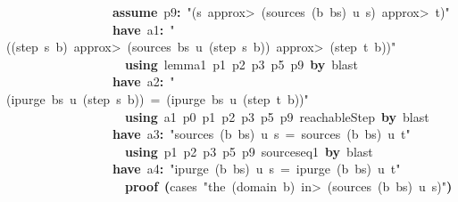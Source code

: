 \documentclass{article}
\newcommand{\syntaxKEYWORDA}[1]{\textcolor[rgb]{0.0,0.4,0.6}{\textbf{#1}}}
\newcommand{\syntaxKEYWORDC}[1]{\textcolor[rgb]{0.0,0.6,1.0}{\textbf{#1}}}
\newcommand{\syntaxLITERALA}[1]{\textcolor[rgb]{1.0,0.0,0.8}{#1}}
\newcommand{\syntaxOPERATOR}[1]{\textcolor[rgb]{0.0,0.0,0.0}{\textbf{#1}}}
\newcommand{\syntaxKEYWORDA}[1]{\textcolor[rgb]{0.0,0.4,0.6}{\textbf{#1}}}
\newcommand{\syntaxKEYWORDC}[1]{\textcolor[rgb]{0.0,0.6,1.0}{\textbf{#1}}}
\newcommand{\syntaxLITERALA}[1]{\textcolor[rgb]{1.0,0.0,0.8}{#1}}
\newcommand{\syntaxOPERATOR}[1]{\textcolor[rgb]{0.0,0.0,0.0}{\textbf{#1}}}
\newcommand{\syntaxKEYWORDA}[1]{\textcolor[rgb]{0.0,0.4,0.6}{\textbf{#1}}}
\newcommand{\syntaxKEYWORDC}[1]{\textcolor[rgb]{0.0,0.6,1.0}{\textbf{#1}}}
\newcommand{\syntaxLITERALA}[1]{\textcolor[rgb]{1.0,0.0,0.8}{#1}}
\newcommand{\syntaxOPERATOR}[1]{\textcolor[rgb]{0.0,0.0,0.0}{\textbf{#1}}}
\newcommand{\syntaxKEYWORDA}[1]{\textcolor[rgb]{0.0,0.4,0.6}{#1}}
\newcommand{\syntaxKEYWORDC}[1]{\textcolor[rgb]{0.0,0.6,1.0}{#1}}
\newcommand{\syntaxLITERALA}[1]{\textcolor[rgb]{1.0,0.0,0.8}{\textbf{#1}}}
\newcommand{\syntaxOPERATOR}[1]{\textcolor[rgb]{0.0,0.0,0.0}{#1}}
\newcommand{\syntaxKEYWORDA}[1]{\textcolor[rgb]{0.0,0.4,0.6}{\textbf{#1}}}
\newcommand{\syntaxKEYWORDC}[1]{\textcolor[rgb]{0.0,0.6,1.0}{\textbf{#1}}}
\newcommand{\syntaxLITERALA}[1]{\textcolor[rgb]{1.0,0.0,0.8}{#1}}
\newcommand{\syntaxOPERATOR}[1]{\textcolor[rgb]{0.0,0.0,0.0}{\textbf{#1}}}
\newcommand{\syntaxKEYWORDA}[1]{\textcolor[rgb]{0.0,0.4,0.6}{\textbf{#1}}}
\newcommand{\syntaxKEYWORDC}[1]{\textcolor[rgb]{0.0,0.6,1.0}{\textbf{#1}}}
\newcommand{\syntaxLITERALA}[1]{\textcolor[rgb]{1.0,0.0,0.8}{#1}}
\newcommand{\syntaxOPERATOR}[1]{\textcolor[rgb]{0.0,0.0,0.0}{\textbf{#1}}}
\begin{document}
{\ }{\ }{\ }{\ }{\ }{\ }{\ }{\ }{\ }{\ }{\ }{\ }{\ }{\ }{\ }{\ }{\ }\syntaxKEYWORDC{assume}{\ }p9\syntaxOPERATOR{:}{\ }\syntaxLITERALA{"(s{\ }\<approx>{\ }(sources{\ }(b{\ }\usebox{\hashbox}{\ }bs){\ }u{\ }s){\ }\<approx>{\ }t)"}\hspace*{\fill}\\
{\ }{\ }{\ }{\ }{\ }{\ }{\ }{\ }{\ }{\ }{\ }{\ }{\ }{\ }{\ }{\ }{\ }\syntaxKEYWORDA{have}{\ }a1\syntaxOPERATOR{:}{\ }\syntaxLITERALA{"((step{\ }s{\ }b){\ }\<approx>{\ }(sources{\ }bs{\ }u{\ }(step{\ }s{\ }b)){\ }\<approx>{\ }(step{\ }t{\ }b))"}\hspace*{\fill}\\
{\ }{\ }{\ }{\ }{\ }{\ }{\ }{\ }{\ }{\ }{\ }{\ }{\ }{\ }{\ }{\ }{\ }{\ }{\ }\syntaxKEYWORDA{using}{\ }lemma\usebox{\underscorebox}1{\ }p1{\ }p2{\ }p3{\ }p5{\ }p9{\ }\syntaxKEYWORDA{by}{\ }blast\hspace*{\fill}\\
{\ }{\ }{\ }{\ }{\ }{\ }{\ }{\ }{\ }{\ }{\ }{\ }{\ }{\ }{\ }{\ }{\ }\syntaxKEYWORDA{have}{\ }a2\syntaxOPERATOR{:}{\ }\syntaxLITERALA{"(ipurge{\ }bs{\ }u{\ }(step{\ }s{\ }b)){\ }={\ }(ipurge{\ }bs{\ }u{\ }(step{\ }t{\ }b))"}\hspace*{\fill}\\
{\ }{\ }{\ }{\ }{\ }{\ }{\ }{\ }{\ }{\ }{\ }{\ }{\ }{\ }{\ }{\ }{\ }{\ }{\ }\syntaxKEYWORDA{using}{\ }a1{\ }p0{\ }p1{\ }p2{\ }p3{\ }p5{\ }p9{\ }reachableStep{\ }\syntaxKEYWORDA{by}{\ }blast\hspace*{\fill}\\
{\ }{\ }{\ }{\ }{\ }{\ }{\ }{\ }{\ }{\ }{\ }{\ }{\ }{\ }{\ }{\ }{\ }\syntaxKEYWORDA{have}{\ }a3\syntaxOPERATOR{:}{\ }\syntaxLITERALA{"sources{\ }(b{\ }\usebox{\hashbox}{\ }bs){\ }u{\ }s{\ }={\ }sources{\ }(b{\ }\usebox{\hashbox}{\ }bs){\ }u{\ }t"}\hspace*{\fill}\\
{\ }{\ }{\ }{\ }{\ }{\ }{\ }{\ }{\ }{\ }{\ }{\ }{\ }{\ }{\ }{\ }{\ }{\ }{\ }\syntaxKEYWORDA{using}{\ }p1{\ }p2{\ }p3{\ }p5{\ }p9{\ }sources\usebox{\underscorebox}eq1{\ }\syntaxKEYWORDA{by}{\ }blast\hspace*{\fill}\\
{\ }{\ }{\ }{\ }{\ }{\ }{\ }{\ }{\ }{\ }{\ }{\ }{\ }{\ }{\ }{\ }{\ }\syntaxKEYWORDA{have}{\ }a4\syntaxOPERATOR{:}{\ }\syntaxLITERALA{"ipurge{\ }(b{\ }\usebox{\hashbox}{\ }bs){\ }u{\ }s{\ }={\ }ipurge{\ }(b{\ }\usebox{\hashbox}{\ }bs){\ }u{\ }t"}\hspace*{\fill}\\
{\ }{\ }{\ }{\ }{\ }{\ }{\ }{\ }{\ }{\ }{\ }{\ }{\ }{\ }{\ }{\ }{\ }{\ }{\ }\syntaxKEYWORDA{proof}{\ }\syntaxOPERATOR{(}cases{\ }\syntaxLITERALA{"the{\ }(domain{\ }b){\ }\<in>{\ }(sources{\ }(b{\ }\usebox{\hashbox}{\ }bs){\ }u{\ }s)"}\syntaxOPERATOR{)}\hspace*{\fill}\\
\end{document}
